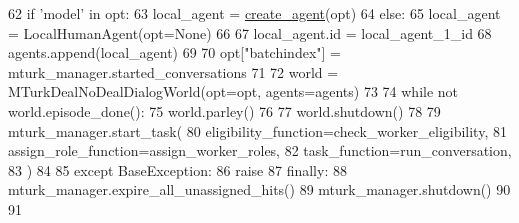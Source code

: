 \begin{DoxyCode}
62                 \textcolor{keywordflow}{if} \textcolor{stringliteral}{'model'} \textcolor{keywordflow}{in} opt:
63                     local\_agent = \hyperlink{namespaceparlai_1_1core_1_1agents_a00d77a7e26fb89e8bd900f7b2a02982a}{create\_agent}(opt)
64                 \textcolor{keywordflow}{else}:
65                     local\_agent = LocalHumanAgent(opt=\textcolor{keywordtype}{None})
66 
67                 local\_agent.id = local\_agent\_1\_id
68                 agents.append(local\_agent)
69 
70             opt[\textcolor{stringliteral}{"batchindex"}] = mturk\_manager.started\_conversations
71 
72             world = MTurkDealNoDealDialogWorld(opt=opt, agents=agents)
73 
74             \textcolor{keywordflow}{while} \textcolor{keywordflow}{not} world.episode\_done():
75                 world.parley()
76 
77             world.shutdown()
78 
79         mturk\_manager.start\_task(
80             eligibility\_function=check\_worker\_eligibility,
81             assign\_role\_function=assign\_worker\_roles,
82             task\_function=run\_conversation,
83         )
84 
85     \textcolor{keywordflow}{except} BaseException:
86         \textcolor{keywordflow}{raise}
87     \textcolor{keywordflow}{finally}:
88         mturk\_manager.expire\_all\_unassigned\_hits()
89         mturk\_manager.shutdown()
90 
91 
\end{DoxyCode}
